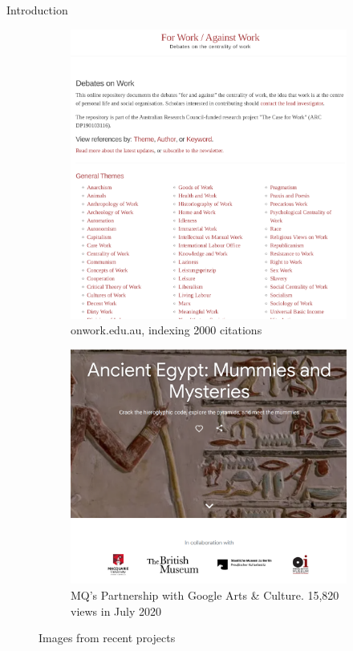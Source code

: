 \documentclass[aspectratio=1610, 11pt]{beamer} %
\begin{document}
\begin{frame}{Introduction}
\begin{figure}
\begin{subfigure}{.19\textwidth}
    \includegraphics[width=\linewidth]{figures/onwork-screenshot.png}
    \caption{onwork.edu.au, indexing 2000 citations}
    \end{subfigure}%
    \hfill%
    \begin{subfigure}{.25\textwidth}
    \centering
    \includegraphics[width=\linewidth]{figures/gac-screenshot.png}
    \caption{MQ's Partnership with Google Arts \& Culture. 15,820 views in July 2020 }
    \end{subfigure}
    \caption{Images from recent projects}
\end{figure}

\end{frame}
\end{document}
